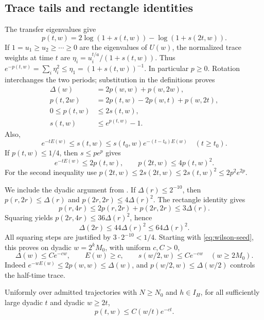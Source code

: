 \subsection{Trace tails and rectangle identities}

The transfer eigenvalues give
\[
 p(t,w)=2\log(1+s(t,w))-\log(1+s(2t,w)).
\]
If $1=u_1\ge u_2\ge\cdots\ge0$ are the eigenvalues of $U(w)$, the
normalized trace weights at time $t$ are
$\eta_i=u_i^{t/a}/(1+s(t,w))$. Thus
$e^{-p(t,w)}=\sum_i\eta_i^2\le\eta_1=(1+s(t,w))^{-1}$.
In particular $p\ge0$. Rotation interchanges the two periods; substitution
in the definitions proves
\begin{equation}
 \begin{aligned}
 \Delta(w)&=2p(w,w)+p(w,2w),\\
 p(t,2w)&=2p(t,w)-2p(w,t)+p(w,2t),\\
 0\le p(t,w)&\le2s(t,w),\\
 s(t,w)&\le e^{p(t,w)}-1.
 \end{aligned}
 \label{eq:rectangle-identities}
\end{equation}
Also,
\begin{equation}
 e^{-tE(w)}\le s(t,w)
 \le s(t_0,w)e^{-(t-t_0)E(w)}\quad(t\ge t_0).
 \label{eq:wilson-trace-advance}
\end{equation}
If $p(t,w)\le1/4$, then $s\le pe^p$ gives
\begin{equation}
 e^{-tE(w)}\le2p(t,w),\qquad
 p(2t,w)\le4p(t,w)^2.
 \label{eq:wilson-squaring}
\end{equation}
For the second inequality use
$p(2t,w)\le2s(2t,w)\le2s(t,w)^2\le2p^2e^{2p}$.

We include the dyadic argument from
\cite[Proposition~2.2]{SharpO4}. If $\Delta(r)\le2^{-10}$,
then $p(r,2r)\le\Delta(r)$ and
$p(2r,2r)\le4\Delta(r)^2$. The rectangle identity gives
\[
 p(r,4r)\le2p(r,2r)+p(2r,2r)\le3\Delta(r).
\]
Squaring yields $p(2r,4r)\le36\Delta(r)^2$, hence
\[
 \Delta(2r)\le44\Delta(r)^2\le64\Delta(r)^2.
\]
All squaring steps are justified by $3\cdot2^{-10}<1/4$.
Starting with \eqref{eq:wilson-seed}, this proves on dyadic
$w=2^kM_0$, with uniform $c,C>0$,
\begin{equation}
 \Delta(w)\le Ce^{-cw},\qquad E(w)\ge c,\qquad
 s(w/2,w)\le Ce^{-cw}\quad(w\ge2M_0).
 \label{eq:wilson-basic-tails}
\end{equation}
Indeed $e^{-wE(w)}\le2p(w,w)\le\Delta(w)$, and
$p(w/2,w)\le\Delta(w/2)$ controls the half-time trace.

\begin{lemma}
\label{lem:wilson-long-rectangles}
Uniformly over admitted trajectories with $N\ge N_0$ and
$h\in I_H$, for all sufficiently large dyadic $t$ and dyadic $w\ge2t$,
\begin{equation}
 p(t,w)\le C(w/t)e^{-ct}.
 \label{eq:wilson-long-rectangle}
\end{equation}
\end{lemma}

